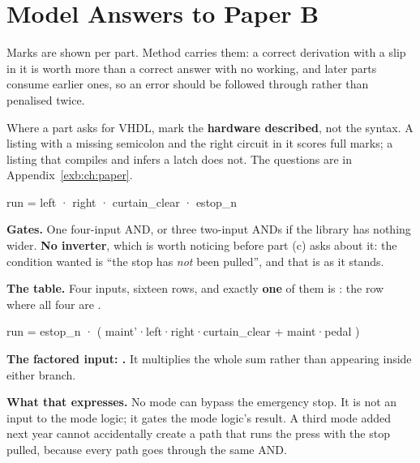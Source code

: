 
\renewcommand{\answerprefix}{ansb}

\chapter{Model Answers to Paper B}
\label{ansb:ch:answers}

Marks are shown per part. Method carries them: a correct derivation with a slip in it is worth more
than a correct answer with no working, and later parts consume earlier ones, so an error should be
followed through rather than penalised twice.

Where a part asks for VHDL, mark the \textbf{hardware described}, not the syntax. A listing with a
missing semicolon and the right circuit in it scores full marks; a listing that compiles and infers
a latch does not. The questions are in Appendix~\ref{exb:ch:paper}.


\begin{textdrawing}
run = left · right · curtain_clear · estop_n
\end{textdrawing}
\noindent{}

\textbf{Gates.} One four-input AND, or three two-input ANDs if the library has nothing wider.
\textbf{No inverter}, which is worth noticing before part (c) asks about it: the condition wanted is
``the stop has \emph{not} been pulled'', and that is  as it stands.

\textbf{The table.} Four inputs, sixteen rows, and exactly \textbf{one} of them is : the row
where all four are . 

\begin{textdrawing}
run = estop_n · ( maint'·left·right·curtain_clear  +  maint·pedal )
\end{textdrawing}
\noindent{}

\textbf{The factored input: .} It multiplies the whole sum rather than appearing
inside either branch.

\textbf{What that expresses.} No mode can bypass the emergency stop. It is not an input to the mode
logic; it gates the mode logic's result. A third mode added next year cannot accidentally create a
path that runs the press with the stop pulled, because every path goes through the same AND.

